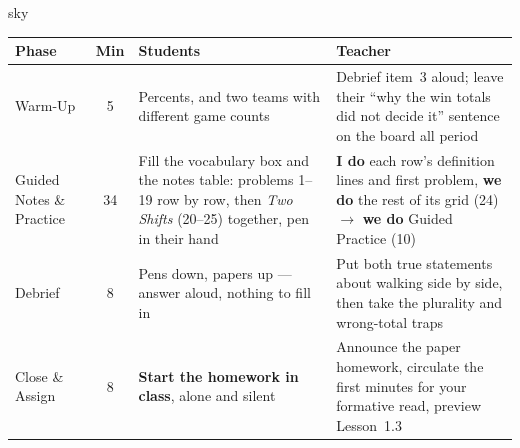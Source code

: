 \documentclass[10pt]{article}
\begin{document}
\boxguard[30]
\begin{skillbox}{sky}
\renewcommand{\arraystretch}{1.25}
\begin{tabularx}{\linewidth}{@{}l c X X@{}}
\textbf{Phase} & \textbf{Min} & \textbf{Students} & \textbf{Teacher} \\
\hline
Warm-Up & 5 & Percents, and two teams with different game counts & Debrief item~3 aloud; leave their ``why the win totals did not decide it'' sentence on the board all period \\
Guided Notes \& Practice & 34 & Fill the vocabulary box and the notes table: problems 1--19 row by row, then \emph{Two Shifts} (20--25) together, pen in their hand & \textbf{I do} each row's definition lines and first problem, \textbf{we do} the rest of its grid (24) $\to$ \textbf{we do} Guided Practice (10) \\
Debrief & 8 & Pens down, papers up --- answer aloud, nothing to fill in & Put both true statements about walking side by side, then take the plurality and wrong-total traps \\
Close \& Assign & 8 & \textbf{Start the homework in class}, alone and silent & Announce the paper homework, circulate the first minutes for your formative read, preview Lesson~1.3 \\
\end{tabularx}
\end{skillbox}
\end{document}
